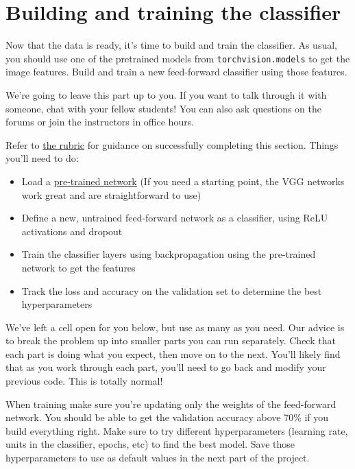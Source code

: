 \documentclass[11pt]{article}
\providecommand{\tightlist}{%
      \setlength{\itemsep}{0pt}\setlength{\parskip}{0pt}}
\begin{document}
    \hypertarget{building-and-training-the-classifier}{%
\section{Building and training the
classifier}\label{building-and-training-the-classifier}}

Now that the data is ready, it's time to build and train the classifier.
As usual, you should use one of the pretrained models from
\texttt{torchvision.models} to get the image features. Build and train a
new feed-forward classifier using those features.

We're going to leave this part up to you. If you want to talk through it
with someone, chat with your fellow students! You can also ask questions
on the forums or join the instructors in office hours.

Refer to \href{https://review.udacity.com/\#!/rubrics/1663/view}{the
rubric} for guidance on successfully completing this section. Things
you'll need to do:

\begin{itemize}
\tightlist
\item
  Load a
  \href{http://pytorch.org/docs/master/torchvision/models.html}{pre-trained
  network} (If you need a starting point, the VGG networks work great
  and are straightforward to use)
\item
  Define a new, untrained feed-forward network as a classifier, using
  ReLU activations and dropout
\item
  Train the classifier layers using backpropagation using the
  pre-trained network to get the features
\item
  Track the loss and accuracy on the validation set to determine the
  best hyperparameters
\end{itemize}

We've left a cell open for you below, but use as many as you need. Our
advice is to break the problem up into smaller parts you can run
separately. Check that each part is doing what you expect, then move on
to the next. You'll likely find that as you work through each part,
you'll need to go back and modify your previous code. This is totally
normal!

When training make sure you're updating only the weights of the
feed-forward network. You should be able to get the validation accuracy
above 70\% if you build everything right. Make sure to try different
hyperparameters (learning rate, units in the classifier, epochs, etc) to
find the best model. Save those hyperparameters to use as default values
in the next part of the project.
\end{document}
